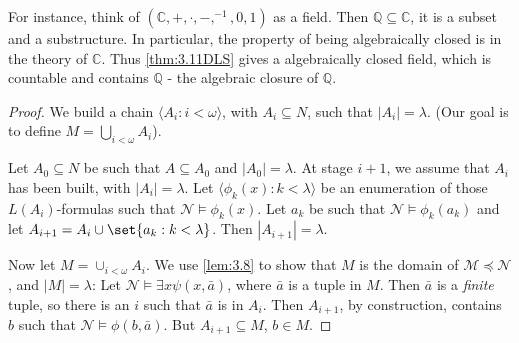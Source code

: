 \documentclass{article}
\let\models\vDash
\begin{document}
For instance, think of $(\mathbb{C}, + , \cdot, -, ^{-1}, 0,1)$ as a field. Then $\mathbb{Q} \subseteq \mathbb{C}$, it is a subset and a substructure.
In particular, the property of being algebraically closed is in the theory of $\mathbb{C}$.
Thus \cref{thm:3.11DLS} gives a algebraically closed field, which is countable and contains $\mathbb{Q}$ - the algebraic closure of $\mathbb{Q}$.

\begin{proof}
  We build a chain $\langle A_i  : i < \omega \rangle$, with $A_i \subseteq N$, such that $|A_i| = \lambda$.
  (Our goal is to define $M = \bigcup_{i < \omega} A_i$).

  Let $A_0 \subseteq N$ be such that $A \subseteq A_0$ and $|A_0| = \lambda$.
  At stage $i+1$, we assume that $A_i$ has been built, with $|A_i| = \lambda$.
  Let $\langle \phi_k(x) : k < \lambda  \rangle$ be an enumeration of those $L(A_i)$-formulas such that $\mathcal{N} \models \phi_k(x)$.
  Let $a_k$ be such that $\mathcal{N} \models \phi_k(a_k)$ and let $A_{i+1} = A_i \cup \set{a_k : k < \lambda}$.
  Then $|A_{i+1}| = \lambda$.

  Now let $M = \cup_{i < \omega} A_i$.
  We use \cref{lem:3.8} to show that $M$ is the domain of $\mathcal{M} \preccurlyeq \mathcal{N}$, and $|M| = \lambda$:
  Let $\mathcal{N} \models \exists x \psi(x,\bar{a})$, where $\bar{a}$ is a tuple in $M$.
  Then $\bar{a}$ is a \emph{finite} tuple, so there is an $i$ such that $\bar{a}$ is in $A_i$.
  Then $A_{i+1}$, by construction, contains $b$ such that $\mathcal{N} \models \phi(b, \bar{a})$.
  But $A_{i+1} \subseteq M$, $b \in M$.
\end{proof}

\clearpage
\end{document}
